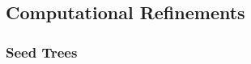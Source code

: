 \documentclass[11pt,letterpaper]{article}
\theoremstyle{definition}
\newcommand{\6}{\mathbf}
\newcommand{\7}{\mathcal}
\begin{document}








\subsection{Computational Refinements}






\subsubsection{Seed Trees}
\end{document}
